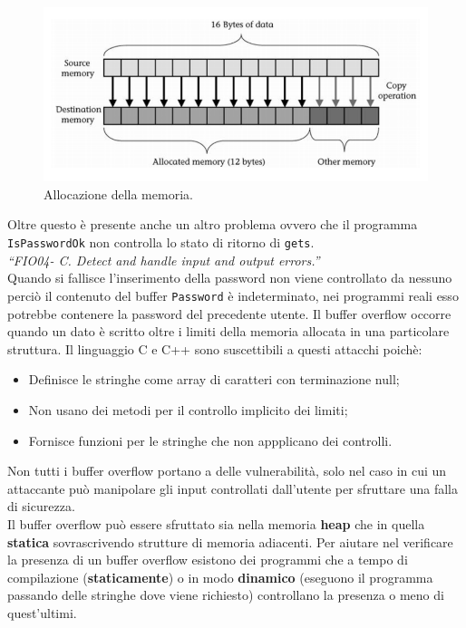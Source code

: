 \begin{figure}[H]
	\centering
    \includegraphics[width=14cm, keepaspectratio]{santini/img/cap_2/memory.png}
	\caption{Allocazione della memoria.}\label{fig:memoria}
\end{figure}
Oltre questo è presente anche un altro problema ovvero che il programma \verb|IsPasswordOk| non controlla lo stato di ritorno di \verb|gets|. \\
\textit{“FIO04- C. Detect and handle input and output errors.”}\\
Quando si fallisce l'inserimento della password non viene controllato da nessuno perciò il contenuto del buffer \verb|Password| è indeterminato, nei programmi reali esso potrebbe contenere la password del precedente utente.
Il buffer overflow occorre quando un dato è scritto oltre i limiti della memoria allocata in una particolare struttura. Il linguaggio C e C++ sono suscettibili a questi attacchi poichè:
\begin{itemize}
    \item Definisce le stringhe come array di caratteri con terminazione null;
    \item Non usano dei metodi per il controllo implicito dei limiti;
    \item Fornisce funzioni per le stringhe che non appplicano dei controlli.
\end{itemize}
Non tutti i buffer overflow portano a delle vulnerabilità, solo nel caso in cui un attaccante può manipolare gli input controllati dall'utente per sfruttare una falla di sicurezza.\\
Il buffer overflow può essere sfruttato sia nella memoria \textbf{heap} che in quella \textbf{statica} sovrascrivendo strutture di memoria adiacenti. Per aiutare nel verificare la presenza di un buffer overflow esistono dei programmi che a tempo di compilazione (\textbf{staticamente}) o in modo \textbf{dinamico} (eseguono il programma passando delle stringhe dove viene richiesto) controllano la presenza o meno di quest'ultimi. 

